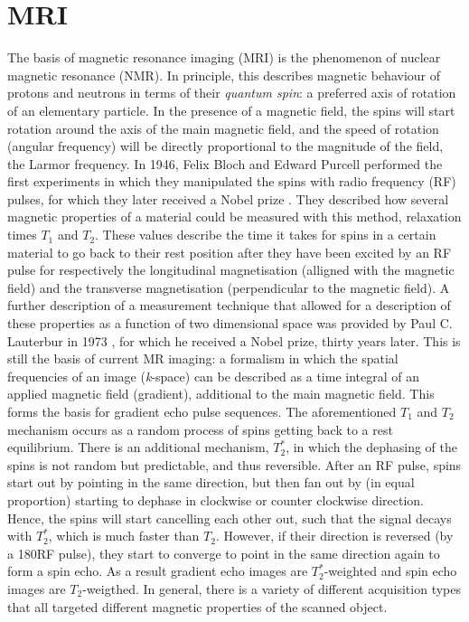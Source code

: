 \section{MRI}
The basis of magnetic resonance imaging (MRI) is the phenomenon of nuclear magnetic resonance (NMR). In principle, this describes magnetic behaviour of protons and neutrons in terms of their \emph{quantum spin}: a preferred axis of rotation of an elementary particle. In the presence of a magnetic field, the spins will start rotation around the axis of the main magnetic field, and the speed of rotation (angular frequency) will be directly proportional to the magnitude of the field, the Larmor frequency. In 1946, Felix Bloch and Edward Purcell performed the first experiments in which they manipulated the spins with radio frequency (RF) pulses, for which they later received a Nobel prize \cite{Bloch1946}. They described how several magnetic properties of a material could be measured with this method, relaxation times $T_1$ and $T_2$.
These values describe the time it takes for spins in a certain material to go back to their rest position after they have been excited by an RF pulse for respectively the longitudinal magnetisation (alligned with the magnetic field) and the transverse magnetisation (perpendicular to the magnetic field). 
A further description of a measurement technique that allowed for a description of these properties as a function of two dimensional space was provided by Paul C. Lauterbur in 1973 \cite{Lauterbur1973}, for which he received a Nobel prize, thirty years later. This is still the basis of current MR imaging: a formalism in which the spatial frequencies of an image (\emph{k}-space) can be described as a time integral of an applied magnetic field (gradient), additional to the main magnetic field. This forms the basis for gradient echo pulse sequences. 
The aforementioned $T_1$ and $T_2$ mechanism occurs as a random process of spins getting back to a rest equilibrium. There is an additional mechanism, $T_2^*$, in which the dephasing of the spins is not random but predictable, and thus reversible. After an RF pulse, spins start out by pointing in the same direction, but then fan out by (in equal proportion) starting to dephase in clockwise or counter clockwise direction. Hence, the spins will start cancelling each other out, such that the signal decays with $T_2^*$, which is much faster than $T_2$. However, if their direction is reversed (by a 180\textdegree RF pulse), they start to converge to point in the same direction again to form a spin echo. As a result gradient echo images are $T_2^*$-weighted and spin echo images are $T_2$-weigthed. In general, there is a variety of different acquisition types that all targeted different magnetic properties of the scanned object. 

